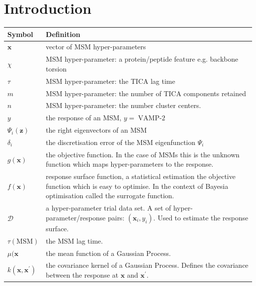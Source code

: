 \section{Introduction}

\begin{table}
    \centering
    \begin{tabularx}{0.9\textwidth}{ |l| >{\raggedright\arraybackslash}X | } 
    \hline
        \textbf{Symbol}  &  \textbf{Definition} \\
        \hline\hline
        $\mathbf{x}$ & vector of MSM hyper-parameters \\
        $\chi$ & MSM hyper-parameter: a protein/peptide feature e.g. backbone torsion \\
        $\tau$ & MSM hyper-parameter: the TICA lag time \\
        $m$ & MSM hyper-parameter: the number of TICA components retained \\
        $n$ & MSM hyper-parameter: the number cluster centers. \\
        $y$ & the response of an MSM, $y =\operatorname{VAMP-2}$ \\
        $\Psi_i(\mathbf{z})$ & the right eigenvectors of an MSM \\
        $\delta_i$ & the discretisation error of the MSM eigenfunction $\Psi_{i}$ \\
        $g(\mathbf{x})$ & the objective function. In the case of MSMs this is the unknown function 
                            which maps hyper-parameters to the response. \\
        $f(\mathbf{x})$ & response surface function, a statistical estimation the objective function 
                          which is easy to optimise. In the context of Bayesia optimisation called the 
                          surrogate function. \\
        $\mathcal{D}$ & a hyper-parameter trial data set. A set of hyper-parameter/response pairs: $(\mathbf{x}_{i}, y_{i})$. Used to estimate the response surface. \\
        $\tau(\mathrm{MSM})$ & the MSM lag time.  \\
        $\mu(\mathbf{x}$ & the mean function of a Gaussian Process. \\
        $k(\mathbf{x}, \mathbf{x}^{\prime})$ & the covariance kernel of a Gaussian Process. Defines the covariance between the response at $\mathbf{x}$ and $\mathbf{x}^{\prime}$. \\

\end{tabularx}
\end{table}
